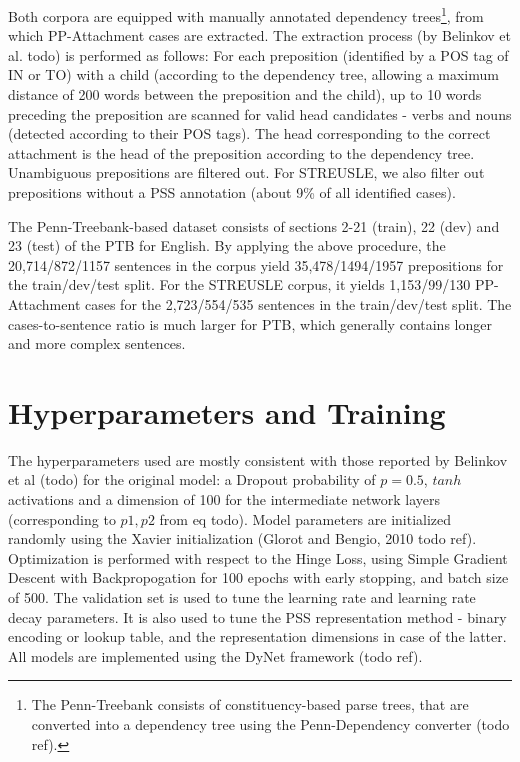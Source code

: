 Both corpora are equipped with manually annotated dependency trees\footnote{The Penn-Treebank consists of constituency-based parse trees, that are converted into a dependency tree using the Penn-Dependency converter (todo ref).}, from which PP-Attachment cases are extracted. The extraction process (by Belinkov et al. todo) is performed as follows: For each preposition (identified by a POS tag of IN or TO) with a child (according to the dependency tree, allowing a maximum distance of 200 words between the preposition and the child), up to 10 words preceding the preposition are scanned for valid head candidates - verbs and nouns (detected according to their POS tags). The head corresponding to the correct attachment is the head of the preposition according to the dependency tree. Unambiguous prepositions are filtered out. For STREUSLE, we also filter out prepositions without a PSS annotation (about 9\% of all identified cases).

The Penn-Treebank-based dataset consists of sections 2-21 (train), 22 (dev) and 23 (test) of the PTB for English. By applying the above procedure, the 20,714/872/1157 sentences in the corpus yield 35,478/1494/1957 prepositions for the train/dev/test split. For the STREUSLE corpus, it yields 1,153/99/130 PP-Attachment cases for the 2,723/554/535 sentences in the train/dev/test split. The cases-to-sentence ratio is much larger for PTB, which generally contains longer and more complex sentences. 
    
\section{Hyperparameters and Training}

The hyperparameters used are mostly consistent with those reported by Belinkov et al (todo) for the original model: a Dropout probability of $p = 0.5$, $tanh$ activations and a dimension of 100 for the intermediate network layers (corresponding to $p1, p2$ from eq todo). Model parameters are initialized randomly using the Xavier initialization (Glorot and Bengio, 2010 todo ref). Optimization is performed with respect to the Hinge Loss, using Simple Gradient Descent with Backpropogation for 100 epochs with early stopping, and batch size of 500. The validation set is used to tune the learning rate and learning rate decay parameters. It is also used to tune the PSS representation method - binary encoding or lookup table, and the representation dimensions in case of the latter. All models are implemented using the DyNet framework (todo ref). 

